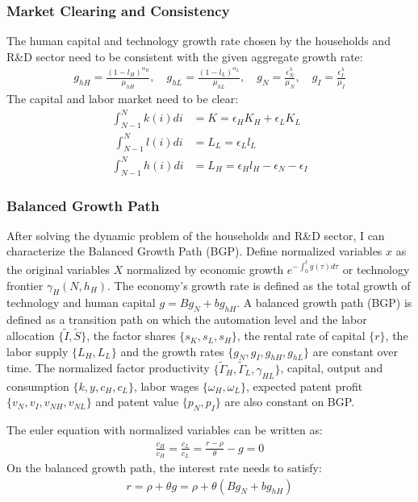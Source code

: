 \documentclass[12pt]{article}
\begin{document}
\subsubsection*{Market Clearing and Consistency}
The human capital and technology growth rate chosen by the households and R\&D sector need to be consistent with the given aggregate growth rate:
\begin{align*}
g_{hH} = \frac{(1-l_H)^{\alpha_H}}{\mu_{hH}}, \quad g_{hL} = \frac{(1-l_L)^{\alpha_L}}{\mu_{hL}}, \quad g_N = \frac{\epsilon_N^{\lambda}}{\mu_N}, \quad g_I = \frac{\epsilon_I^{\lambda}}{\mu_I} 
\end{align*}
The capital and labor market need to be clear: 
\begin{align*}
\int_{N-1}^N k(i) di &= K = \epsilon_H K_H + \epsilon_L K_L \\\
\int_{N-1}^N l(i) di &= L_L = \epsilon_L l_L \\
\int_{N-1}^N h(i) di &= L_H = \epsilon_H l_H-\epsilon_N-\epsilon_I
\end{align*}

\subsubsection*{Balanced Growth Path}
After solving the dynamic problem of the households and R\&D sector, I can characterize the Balanced Growth Path (BGP). Define normalized variables $x$ as the original variables $X$ normalized by economic growth $e^{-\int_0^{t}g(\tau)d\tau}$ or technology frontier $\gamma_H(N,h_H)$. The economy's growth rate is defined as the total growth of technology and human capital $g = Bg_N+bg_{hH}$. A balanced growth path (BGP) is defined as a transition path on which the automation level and the labor allocation $\{\tilde{I},\tilde{S}\}$, the factor shares $\{s_K,s_L, s_H\}$, the rental rate of capital $\{r\}$, the labor supply $\{L_H, L_L\}$ and the growth rates $\{g_N, g_I, g_{hH},g_{hL}\}$ are constant over time. The normalized factor productivity $\{\tilde{\Gamma}_H, \tilde{\Gamma}_L, \gamma_{HL}\}$, capital, output and consumption $\{k, y, c_H, c_L\}$, labor wages $\{\omega_H, \omega_L\}$, expected patent profit $\{v_N,v_I,v_{NH},v_{NL}\}$ and patent value $\{p_N, p_I\}$ are also constant on BGP.

The euler equation with normalized variables can be written as: 
\begin{align*}
\frac{\dot{c_H}}{c_H} = \frac{\dot{c_L}}{c_L} = \frac{r-\rho}{\theta}-g = 0 
\end{align*}
On the balanced growth path, the interest rate needs to satisfy: 
\begin{align}
\label{LRR}
r = \rho+\theta g = \rho+\theta(Bg_N+bg_{hH})
\end{align}
\end{document}
